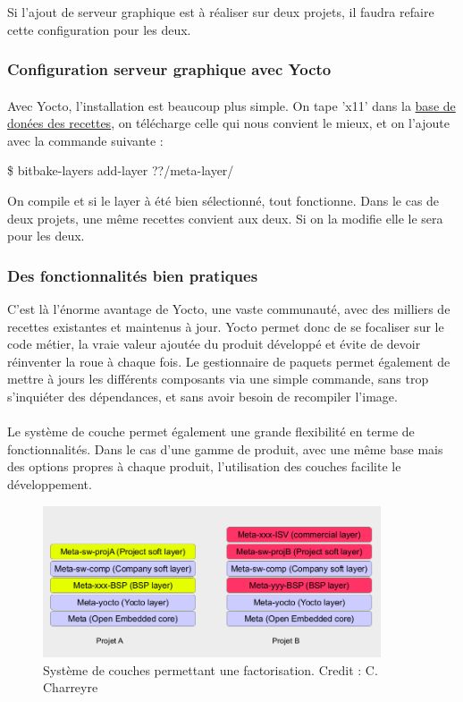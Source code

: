 Si l'ajout de serveur graphique est à réaliser sur deux projets, il faudra refaire cette configuration pour les deux.

\subsubsection{Configuration serveur graphique avec Yocto}
\paragraph{}
Avec Yocto, l'installation est beaucoup plus simple. On tape 'x11' dans la \href{https://layers.openembedded.org/layerindex/branch/master/recipes/?q=x11}{\color{blue}base de donées des recettes}, on télécharge celle qui nous convient le mieux, et on l'ajoute avec la commande suivante : 

\$ bitbake-layers add-layer ??/meta-layer/

On compile et si le layer à été bien sélectionné, tout fonctionne. Dans le cas de deux projets, une même recettes convient aux deux. Si on la modifie elle le sera pour les deux.

\subsubsection{Des fonctionnalités bien pratiques}
C'est là l'énorme avantage de Yocto, une vaste communauté, avec des milliers de recettes existantes et maintenus à jour. Yocto permet donc de se focaliser sur le code métier, la vraie valeur ajoutée du produit développé et évite de devoir réinventer la roue à chaque fois. Le gestionnaire de paquets permet également de mettre à jours les différents composants via une simple commande, sans trop s'inquiéter des dépendances, et sans avoir besoin de recompiler l'image.



\paragraph{}
Le système de couche permet également une grande flexibilité en terme de fonctionnalités. Dans le cas d'une gamme de produit, avec une même base mais des options propres à chaque produit, l'utilisation des couches facilite le développement.

\begin{figure}[h!]
    \centering
    \includegraphics[width=10cm]{Images/reutilisable yocto.png}
    \caption{Système de couches permettant une factorisation. Credit : C. Charreyre}
\end{figure}